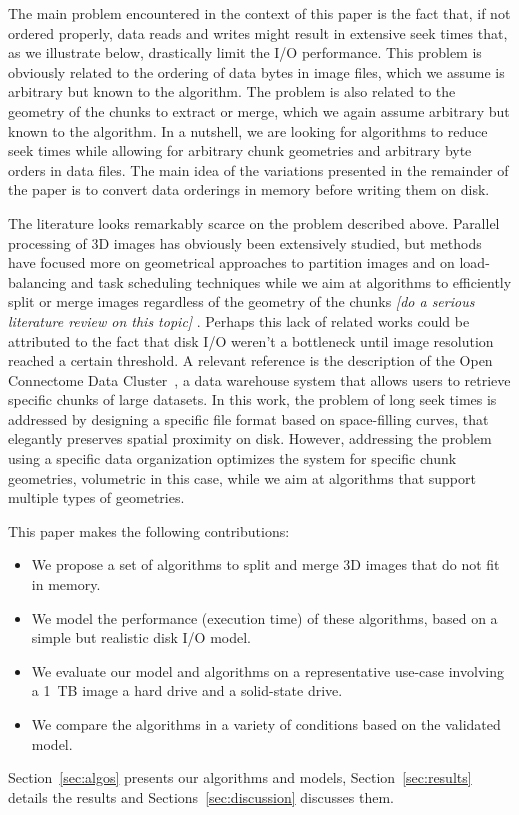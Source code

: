 \documentclass[10pt, conference, compsocconf]{IEEEtran}
\newcommand{\todo}[1]{
  \color{red}\emph{[#1]}
  \color{black}
}
\begin{document}
The main problem encountered in the context of this paper is the fact
that, if not ordered properly, data reads and writes might result in
extensive seek times that, as we illustrate below, drastically limit
the I/O performance. This problem is obviously related to the ordering
of data bytes in image files, which we assume is arbitrary but known
to the algorithm. The problem is also related to the geometry of the
chunks to extract or merge, which we again assume arbitrary but known
to the algorithm. In a nutshell, we are looking for algorithms to
reduce seek times while allowing for arbitrary chunk geometries and
arbitrary byte orders in data files. The main idea of the variations
presented in the remainder of the paper is to convert data orderings
in memory before writing them on disk. 

The literature looks remarkably scarce on the problem described
above. Parallel processing of 3D images has obviously been extensively
studied, but methods have focused more on geometrical approaches to
partition images and on load-balancing and task scheduling techniques
while we aim at algorithms to efficiently split or merge images
regardless of the geometry of the chunks \todo{do a serious literature
review on this topic}. Perhaps this lack of related works could be
attributed to the fact that disk I/O weren't a bottleneck until image
resolution reached a certain threshold. A relevant reference is the
description of the Open Connectome Data Cluster~\cite{burns2013open},
a data warehouse system that allows users to retrieve specific chunks
of large datasets. In this work, the problem of long seek times is
addressed by designing a specific file format based on space-filling
curves, that elegantly preserves spatial proximity on disk. However,
addressing the problem using a specific data organization optimizes
the system for specific chunk geometries, volumetric in this case,
while we aim at algorithms that support multiple types of geometries.

This paper makes the following contributions:
\begin{itemize}
  \item We propose a set of algorithms to split and merge 3D images
    that do not fit in memory.
  \item We model the performance (execution time) of these algorithms,
    based on a simple but realistic disk I/O model.
  \item We evaluate our model and algorithms on a representative
    use-case involving a 1~TB image a hard drive and a solid-state
    drive.
  \item We compare the algorithms in a variety of conditions based on the validated model.
\end{itemize}
Section~\ref{sec:algos} presents our algorithms and models,
Section~\ref{sec:results} details the results and
Sections~\ref{sec:discussion} discusses them.
\end{document}
